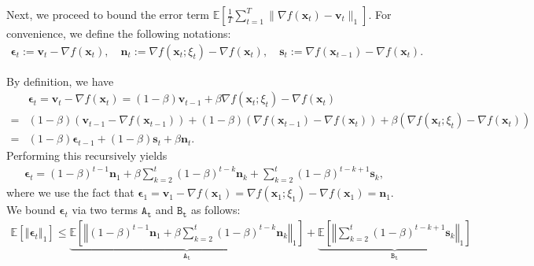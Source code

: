 \documentclass{article}
\def\eps{{\epsilon}}
\newcommand{\E}{\mathbb{E}}
\def \E {\mathbb{E}}
\def \v {\mathbf{v}}
\def \x {\mathbf{x}}
\newcommand{\norm}[1]{\left\Vert#1\right\Vert}
\def \eps {\bm{\epsilon}}
\newcommand{\sqbrac}[1]{\left[#1\right]}
\newcommand{\brac}[1]{\left(#1\right)}
\def \E {\mathbb{E}}
\def \x {\mathbf{x}}
\def \v {\mathbf{v}}
\def \n {\mathbf{n}}
\def \s {\mathbf{s}}
\begin{document}
Next, we proceed to bound the error term $\E\left[\frac{1}{T}\sum_{t=1}^{T} \|\nabla f(\x_t) - \v_t\|_1\right]$. For convenience, we define the following notations:
\begin{align*}
    \eps_t:=\v_t-\nabla f(\x_t),\quad \n_t:=\nabla f(\x_t;\xi_t)-\nabla f(\x_t),\quad \s_t:=\nabla f(\x_{t-1})-\nabla f(\x_t).
\end{align*}

By definition, we have
    \begin{align*}
        &\eps_t=\v_t-\nabla f(\x_t)=(1-\beta)\v_{t-1}+\beta\nabla f(\x_t;\xi_t)-\nabla f(\x_t)\\=&(1-\beta)\brac{\v_{t-1}-\nabla f(\x_{t-1})}+(1-\beta)\brac{\nabla f(\x_{t-1})-\nabla f(\x_{t})}+\beta\brac{\nabla f(\x_t;\xi_t)-\nabla f(\x_t)}\\=&(1-\beta)\eps_{t-1}+(1-\beta)\s_t+\beta\n_t.
    \end{align*}
Performing this recursively yields
    \begin{align*}
        \eps_t=(1-\beta)^{t-1}\n_1+\beta\sum_{k=2}^t(1-\beta)^{t-k}\n_k+\sum_{k=2}^t(1-\beta)^{t-k+1}\s_k,
    \end{align*}
    where we use the fact that $\eps_1=\v_1-\nabla f(\x_1)=\nabla f(\x_1;\xi_1)-\nabla f(\x_1)=\n_1$.
We bound $\eps_t$ via two terms $\mathtt{A_t}$ and $\mathtt{B_t}$ as follows:
\begin{align*}
    \E\sqbrac{\norm{\eps_t}_1}\le \underbrace{\E\sqbrac{\norm{(1-\beta)^{t-1}\n_1+\beta\sum_{k=2}^t(1-\beta)^{t-k}\n_k}_1}}_{\mathtt{A_t}}+\underbrace{\E\sqbrac{\norm{\sum_{k=2}^t(1-\beta)^{t-k+1}\s_k}_1}}_{\mathtt{B_t}}
\end{align*}
\end{document}
